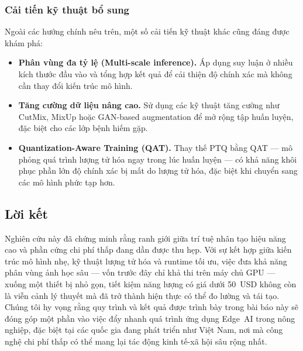\documentclass[conference]{IEEEtran}
\begin{document}
\subsubsection{Cải tiến kỹ thuật bổ sung}

Ngoài các hướng chính nêu trên, một số cải tiến kỹ thuật khác cũng đáng được khám phá:

\begin{itemize}
  \item \textbf{Phân vùng đa tỷ lệ (Multi-scale inference).} Áp dụng suy luận ở nhiều kích thước đầu vào và tổng hợp kết quả để cải thiện độ chính xác mà không cần thay đổi kiến trúc mô hình.
  \item \textbf{Tăng cường dữ liệu nâng cao.} Sử dụng các kỹ thuật tăng cường như CutMix, MixUp hoặc GAN-based augmentation để mở rộng tập huấn luyện, đặc biệt cho các lớp bệnh hiếm gặp.
  \item \textbf{Quantization-Aware Training (QAT).} Thay thế PTQ bằng QAT --- mô phỏng quá trình lượng tử hóa ngay trong lúc huấn luyện --- có khả năng khôi phục phần lớn độ chính xác bị mất do lượng tử hóa, đặc biệt khi chuyển sang các mô hình phức tạp hơn.
\end{itemize}

\subsection{Lời kết}

Nghiên cứu này đã chứng minh rằng ranh giới giữa trí tuệ nhân tạo hiệu năng cao và phần cứng chi phí thấp đang dần được thu hẹp. Với sự kết hợp giữa kiến trúc mô hình nhẹ, kỹ thuật lượng tử hóa và runtime tối ưu, việc đưa khả năng phân vùng ảnh học sâu --- vốn trước đây chỉ khả thi trên máy chủ GPU --- xuống một thiết bị nhỏ gọn, tiết kiệm năng lượng có giá dưới 50~USD không còn là viễn cảnh lý thuyết mà đã trở thành hiện thực có thể đo lường và tái tạo. Chúng tôi hy vọng rằng quy trình và kết quả được trình bày trong bài báo này sẽ đóng góp một phần vào việc đẩy nhanh quá trình ứng dụng Edge~AI trong nông nghiệp, đặc biệt tại các quốc gia đang phát triển như Việt Nam, nơi mà công nghệ chi phí thấp có thể mang lại tác động kinh tế-xã hội sâu rộng nhất.




\end{document}
